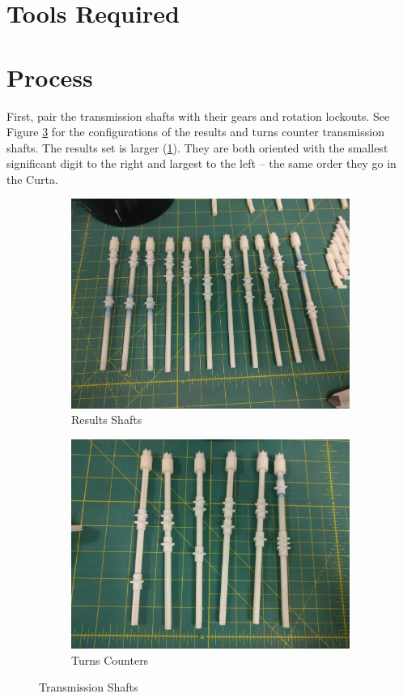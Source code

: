 \documentclass[openany]{book}
\begin{document}
\section{Tools Required}

\section{Process}
First, pair the transmission shafts with their gears and rotation lockouts. See Figure \ref{fig:transmission} for the configurations of the results and turns counter transmission shafts. The results set is larger (\ref{fig:image21}). They are both oriented with the smallest significant digit to the right and largest to the left -- the same order they go in the Curta.

\begin{figure}[!ht]
	\centering
	\begin{subfigure}{.4\textwidth}
		\centering
		\includegraphics[width=.95\textwidth]{images/image21.jpg}
		\caption{Results Shafts}
		\label{fig:image21}	
	\end{subfigure}
	\begin{subfigure}{.4\textwidth}
		\centering
		\includegraphics[width=.95\textwidth]{images/image40.jpg}
		\caption{Turns Counters}
		\label{fig:image40}	
	\end{subfigure}
	\caption{Transmission Shafts}
	\label{fig:transmission}
\end{figure}
\end{document}
